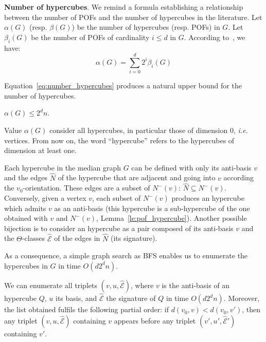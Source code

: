 \documentclass[a4paper,UKenglish,numberwithinsect,cleveref, autoref]{lipics-v2021}
\begin{document}
\textbf{Number of hypercubes}. We remind a formula establishing a relationship between the number of POFs and the number of hypercubes in the literature. Let $\alpha(G)$ (resp. $\beta(G)$) be the number of hypercubes (resp. POFs) in $G$. Let $\beta_i(G)$ be the number of POFs of cardinality $i \le d$ in $G$. According to~\cite{BaQuSaMa02,Ko09}, we have:
\begin{equation}
\alpha(G) = \sum_{i=0}^d 2^i\beta_i(G)
\label{eq:number_hypercubes}
\end{equation}

Equation~\eqref{eq:number_hypercubes} produces a natural upper bound for the number of hypercubes.

\begin{lemma}
$\alpha(G)\le 2^dn$.
\label{le:number_hypercubes}
\end{lemma}

Value $\alpha(G)$ consider all hypercubes, in particular those of dimension 0, {\em i.e.} vertices. From now on, the word ``hypercube'' refers to the hypercubes of dimension at least one.

Each hypercube in the median graph $G$ can be defined with only its anti-basis $v$ and the edges $\widehat{N}$ of the hypercube that are adjacent and going into $v$ according the $v_0$-orientation. These edges are a subset of $N^-(v)$: $\widehat{N} \subseteq N^-(v)$. Conversely, given a vertex $v$, each subset of $N^-(v)$ produces an hypercube which admits $v$ as an anti-basis (this hypercube is a sub-hypercube of the one obtained with $v$ and $N^-(v)$, Lemma~\ref{le:pof_hypercube}). Another possible bijection is to consider an hypercube as a pair composed of its anti-basis $v$ and the $\Theta$-classes $\widehat{\mathcal{E}}$ of the edges in $\widehat{N}$ (its signature).

As a consequence, a simple graph search as BFS enables us to enumerate the hypercubes in $G$ in time $O(d2^dn)$.

\begin{lemma}
We can enumerate all triplets $(v,u,\widehat{\mathcal{E}})$, where $v$ is the anti-basis of an hypercube $Q$, $u$ its basis, and $\widehat{\mathcal{E}}$ the signature of $Q$ in time $O(d2^dn)$. Moreover, the list obtained fulfils the following partial order: if $d(v_0,v) < d(v_0,v')$, then any triplet $(v,u,\widehat{\mathcal{E}})$ containing $v$ appears before any triplet $(v',u',\widehat{\mathcal{E}}')$ containing $v'$.
\label{le:enum_hypercubes}
\end{lemma}
\end{document}
